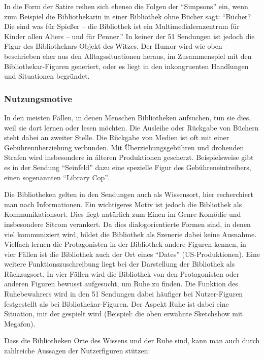 In die Form der Satire reihen sich ebenso die Folgen der
\enquote{Simpsons} ein, wenn zum Beispiel die Bibliothekarin in einer
Bibliothek ohne Bücher sagt: \enquote{Bücher? Die sind was für Spießer
-- die Bibliothek ist ein Multimedialernzentrum für Kinder allen Alters
-- und für Penner.} In keiner der 51 Sendungen ist jedoch die Figur des
Bibliothekars Objekt des Witzes. Der Humor wird wie oben beschrieben
eher aus den Alltagssituationen heraus, im Zusammenspiel mit den
Bibliothekar-Figuren generiert, oder es liegt in den inkongruenten
Handlungen und Situationen begründet.

\subsubsection{Nutzungsmotive}\label{nutzungsmotive}

In den meisten Fällen, in denen Menschen Bibliotheken aufsuchen, tun sie
dies, weil sie dort lernen oder lesen möchten. Die Ausleihe oder
Rückgabe von Büchern steht dabei an zweiter Stelle. Die Rückgabe von
Medien ist oft mit einer Gebührenüberziehung verbunden. Mit
Überziehungsgebühren und drohenden Strafen wird insbesondere in älteren
Produktionen gescherzt. Beispielsweise gibt es in der Sendung
\enquote{Seinfeld} dazu eine spezielle Figur des Gebühreneintreibers,
einen sogenannten \enquote{Library Cop}.

Die Bibliotheken gelten in den Sendungen auch als Wissensort, hier
recherchiert man nach Informationen. Ein wichtigeres Motiv ist jedoch
die Bibliothek als Kommunikationsort. Dies liegt natürlich zum Einen im
Genre Komödie und insbesondere Sitcom verankert. Da dies
dialogorientierte Formen sind, in denen viel kommuniziert wird, bildet
die Bibliothek als Szenerie dabei keine Ausnahme. Vielfach lernen die
Protagonisten in der Bibliothek andere Figuren kennen, in vier Fällen
ist die Bibliothek auch der Ort eines \enquote{Dates} (US-Produktionen).
Eine weitere Funktionszuschreibung liegt bei der Darstellung der
Bibliothek als Rückzugsort. In vier Fällen wird die Bibliothek von den
Protagonisten oder anderen Figuren bewusst aufgesucht, um Ruhe zu
finden. Die Funktion des Ruhebewahrers wird in den 51
Sendungen dabei häufiger bei Nutzer-Figuren festgestellt als bei
Bibliothekar-Figuren. Der Aspekt Ruhe ist dabei eine Situation, mit der
gespielt wird (Beispiel: die oben erwähnte Sketchshow mit Megafon).

Dass die Bibliotheken Orte des Wissens und der Ruhe sind, kann man auch
durch zahlreiche Aussagen der Nutzerfiguren stützen:

